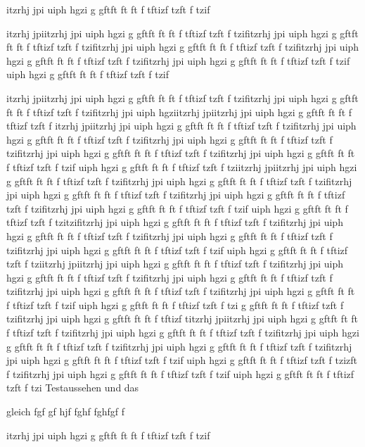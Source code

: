 \documentclass{teacher}
\begin{document}
itzrhj jpi uiph hgzi g gftft ft ft f tftizf tzft f tzif



itzrhj jpiitzrhj jpi uiph hgzi g gftft ft ft f
tftizf tzft f tzifitzrhj jpi uiph hgzi g gftft ft ft f tftizf tzft f tzifitzrhj
jpi uiph hgzi g gftft ft ft f tftizf tzft f tzifitzrhj jpi uiph hgzi g gftft ft
ft f tftizf tzft f tzifitzrhj jpi uiph hgzi g gftft ft ft f tftizf tzft f tzif
uiph hgzi g gftft ft ft f tftizf tzft f tzif 



itzrhj jpiitzrhj jpi uiph hgzi g gftft ft ft f
tftizf tzft f tzifitzrhj jpi uiph hgzi g gftft ft ft f tftizf tzft f tzifitzrhj
jpi uiph hgziitzrhj jpiitzrhj jpi uiph hgzi g gftft ft ft f
tftizf tzft f itzrhj jpiitzrhj jpi uiph hgzi g gftft ft ft f
tftizf tzft f tzifitzrhj jpi uiph hgzi g gftft ft ft f tftizf tzft f tzifitzrhj
jpi uiph hgzi g gftft ft ft f tftizf tzft f tzifitzrhj jpi uiph hgzi g gftft ft
ft f tftizf tzft f tzifitzrhj jpi uiph hgzi g gftft ft ft f tftizf tzft f tzif
uiph hgzi g gftft ft ft f tftizf tzft f tziitzrhj jpiitzrhj jpi uiph hgzi g gftft ft ft f
tftizf tzft f tzifitzrhj jpi uiph hgzi g gftft ft ft f tftizf tzft f tzifitzrhj
jpi uiph hgzi g gftft ft ft f tftizf tzft f tzifitzrhj jpi uiph hgzi g gftft ft
ft f tftizf tzft f tzifitzrhj jpi uiph hgzi g gftft ft ft f tftizf tzft f tzif
uiph hgzi g gftft ft ft f tftizf tzft f tzitzifitzrhj jpi uiph hgzi g gftft ft ft f tftizf tzft f tzifitzrhj
jpi uiph hgzi g gftft ft ft f tftizf tzft f tzifitzrhj jpi uiph hgzi g gftft ft
ft f tftizf tzft f tzifitzrhj jpi uiph hgzi g gftft ft ft f tftizf tzft f tzif
uiph hgzi g gftft ft ft f tftizf tzft f tziitzrhj jpiitzrhj jpi uiph hgzi g gftft ft ft f
tftizf tzft f tzifitzrhj jpi uiph hgzi g gftft ft ft f tftizf tzft f tzifitzrhj
jpi uiph hgzi g gftft ft ft f tftizf tzft f tzifitzrhj jpi uiph hgzi g gftft ft
ft f tftizf tzft f tzifitzrhj jpi uiph hgzi g gftft ft ft f tftizf tzft f tzif
uiph hgzi g gftft ft ft f tftizf tzft f tzi g gftft ft ft f tftizf tzft f tzifitzrhj jpi uiph hgzi g gftft ft
ft f tftizf titzrhj jpiitzrhj jpi uiph hgzi g gftft ft ft f
tftizf tzft f tzifitzrhj jpi uiph hgzi g gftft ft ft f tftizf tzft f tzifitzrhj
jpi uiph hgzi g gftft ft ft f tftizf tzft f tzifitzrhj jpi uiph hgzi g gftft ft
ft f tftizf tzft f tzifitzrhj jpi uiph hgzi g gftft ft ft f tftizf tzft f tzif
uiph hgzi g gftft ft ft f tftizf tzft f tzizft f tzifitzrhj jpi uiph hgzi g gftft ft ft f tftizf tzft f tzif
uiph hgzi g gftft ft ft f tftizf tzft f tzi
Testaussehen 
\grad und das 

\entspricht{} gleich 
fgf gf hjf fghf fghfgf f 


itzrhj jpi uiph hgzi g gftft ft ft f tftizf tzft f tzif

\end{document}
